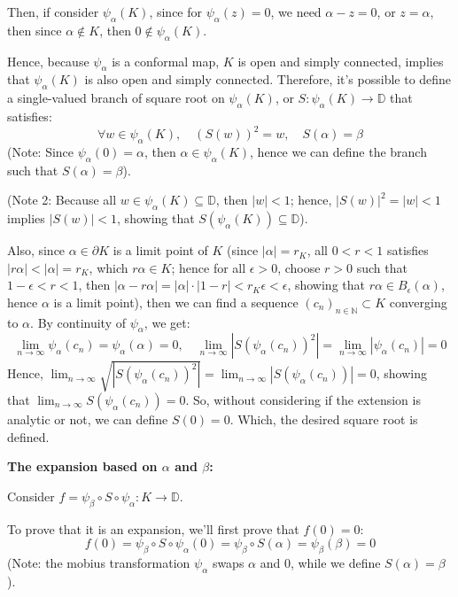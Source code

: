 \documentclass{article}
\begin{document}
\begin{itemize}
    Then, if consider $\psi_\alpha(K)$, since for $\psi_\alpha(z)=0$, we need $\alpha-z=0$, or $z=\alpha$, then since $\alpha\notin K$, then $0\notin \psi_\alpha(K)$.

    Hence, because $\psi_\alpha$ is a conformal map, $K$ is open and simply connected, implies that $\psi_\alpha(K)$ is also open and simply connected.
    Therefore, it's possible to define a single-valued branch of square root on $\psi_\alpha(K)$, or $S:\psi_\alpha(K)\rightarrow\mathbb{D}$ that satisfies:
    $$\forall w\in\psi_\alpha(K),\quad (S(w))^2=w,\quad S(\alpha)=\beta$$
    (Note: Since $\psi_\alpha(0)=\alpha$, then $\alpha\in \psi_\alpha(K)$, hence we can define the branch such that $S(\alpha)=\beta$).

    (Note 2: Because all $w\in \psi_\alpha(K)\subseteq \mathbb{D}$, then $|w|<1$; hence, $|S(w)|^2 = |w| <1$ implies $|S(w)|<1$, showing that $S(\psi_\alpha(K))\subseteq \mathbb{D}$).
    
    Also, since $\alpha\in \partial K$ is a limit point of $K$ (since $|\alpha|=r_K$, all $0<r<1$ satisfies $|r\alpha|<|\alpha|=r_K$, which $r\alpha \in K$; hence for all $\epsilon>0$, choose $r>0$ such that $1-\epsilon<r<1$, then $|\alpha-r\alpha|=|\alpha|\cdot|1-r| <r_K\epsilon<\epsilon$, showing that $r\alpha\in B_\epsilon(\alpha)$, hence $\alpha$ is a limit point),
    then we can find a sequence $(c_n)_{n\in\mathbb{N}}\subset K$ converging to $\alpha$. By continuity of $\psi_\alpha$, we get:
    $$\lim_{n\rightarrow\infty}\psi_{\alpha}(c_n)=\psi_\alpha(\alpha)=0,\quad \lim_{n\rightarrow\infty}|S(\psi_\alpha(c_n))^2|=\lim_{n\rightarrow\infty}|\psi_\alpha(c_n)|=0$$
    Hence, $\lim_{n\rightarrow\infty}\sqrt{|S(\psi_\alpha(c_n))^2|}=\lim_{n\rightarrow\infty}|S(\psi_\alpha(c_n))|=0$, showing that $\lim_{n\rightarrow\infty}S(\psi_\alpha(c_n))=0$.
    So, without considering if the extension is analytic or not, we can define $S(0)=0$. Which, the desired square root is defined.

    \hfil

    \textbf{The expansion based on $\alpha$ and $\beta$:}

    Consider $f=\psi_\beta\circ S\circ \psi_\alpha:K\rightarrow\mathbb{D}$. 
    
    To prove that it is an expansion, we'll first prove that $f(0)=0$:
    $$f(0)=\psi_\beta\circ S\circ \psi_\alpha(0)=\psi_\beta\circ S(\alpha)=\psi_\beta(\beta)=0$$
    (Note: the mobius transformation $\psi_\alpha$ swaps $\alpha$ and $0$, while we define $S(\alpha)=\beta$).
    

\end{itemize}
\end{document}
